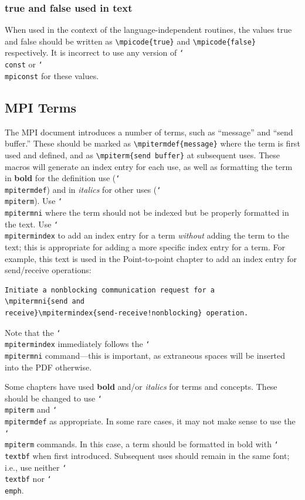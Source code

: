 \documentclass[letterpaper,twoside,11pt,fleqn]{article}
\def\cmd#1{\texttt{\char`\\#1}}
\def\MPI/{\textsf{MPI}}    %
\begin{document}
\subsubsection{true and false used in text}
When used in the context of the language-independent routines, the
values \textsf{true} and \textsf{false} should be written as
\verb+\mpicode{true}+ and \verb+\mpicode{false}+ respectively.
It is incorrect to use any version of \cmd{const} or \cmd{mpiconst}
for these values.

\subsection{\texorpdfstring{\MPI/}{MPI} Terms}
\label{sec:terms}
The \MPI/ document introduces a number of terms, such as ``message''
and ``send buffer.''
These should be marked as \verb+\mpitermdef{message}+ where the term
is first used and defined, and as \verb+\mpiterm{send buffer}+ at
subsequent uses.  These macros will generate an index entry for each
use, as well as formatting the term in \textbf{bold} for the
definition use (\cmd{mpitermdef}) and in \emph{italics} for other uses
(\cmd{mpiterm}).
Use \cmd{mpitermni} where the term should not be indexed but be
properly formatted in the text.
Use \cmd{mpitermindex} to add an index entry for a term \emph{without}
adding the term to the text; this is appropriate for adding a more
specific index entry for a term.
For example, this text is used in the Point-to-point chapter to
add an index entry for send/receive operations:

\begin{verbatim}
Initiate a nonblocking communication request for a
\mpitermni{send and
receive}\mpitermindex{send-receive!nonblocking} operation.
\end{verbatim}
Note that the \cmd{mpitermindex} immediately follows the
\cmd{mpitermni} command---this is important, as extraneous spaces will
be inserted into the PDF otherwise.

Some chapters have used \textbf{bold} and/or \emph{italics} for terms
and concepts.
These should be changed to use \cmd{mpiterm} and \cmd{mpitermdef} as
appropriate.
In some rare cases, it may not make sense to use the \cmd{mpiterm}
commands. In this case, a term should be formatted in bold with
\cmd{textbf} when first introduced. Subsequent uses should remain in
the same font; i.e., use neither \cmd{textbf} nor \cmd{emph}.
\end{document}
